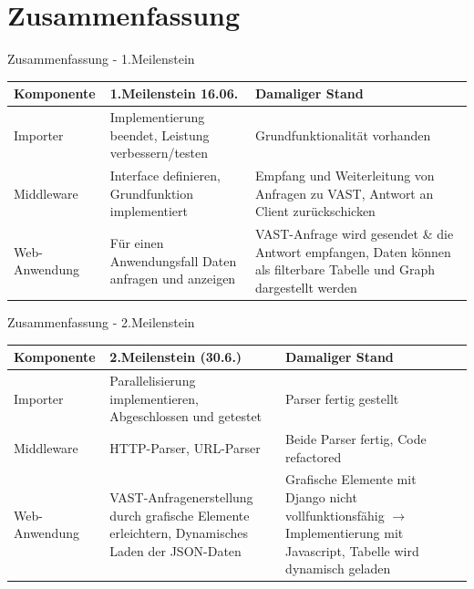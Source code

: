\documentclass[9pt]{beamer}
\begin{document}
\section{Zusammenfassung	}

\begin{frame}{Zusammenfassung - 1.Meilenstein}

	\begin{table}[h!]
	\centering
	\begin{tabular}{p{5em} p{12em} p{14em}}
		\textbf{Komponente} & \textbf{1.Meilenstein 16.06.} & \textbf{Damaliger Stand} \\ \midrule
		Importer & Implementierung beendet, Leistung verbessern/testen &  Grundfunktionalität vorhanden\\ \midrule
		Middleware & Interface definieren, Grundfunktion implementiert & Empfang und Weiterleitung von Anfragen zu VAST, Antwort an Client zurückschicken \\ \midrule
		Web-Anwendung & Für einen Anwendungsfall Daten anfragen und anzeigen & VAST-Anfrage wird gesendet \& die Antwort empfangen, Daten können als filterbare Tabelle und Graph dargestellt werden \\ \bottomrule
	\end{tabular}
	\end{table}
\end{frame}

\begin{frame}{Zusammenfassung - 2.Meilenstein}
	\begin{table}[h!]
	\centering
	\begin{tabular}{p{5em} p{12em} p{14em}}
		\textbf{Komponente} & \textbf{2.Meilenstein (30.6.)} & \textbf{Damaliger Stand} \\ \midrule
		Importer & Parallelisierung implementieren, Abgeschlossen und getestet &  Parser fertig gestellt\\ \midrule
		Middleware & HTTP-Parser, URL-Parser	& Beide Parser fertig, Code refactored\\ \midrule
		Web-Anwendung &  VAST-Anfragenerstellung durch grafische Elemente erleichtern, Dynamisches Laden der JSON-Daten & Grafische Elemente mit Django nicht vollfunktionsfähig $\rightarrow$ Implementierung mit Javascript, Tabelle wird dynamisch geladen \\ \bottomrule
	\end{tabular}
	\end{table}
\end{frame}
\end{document}
